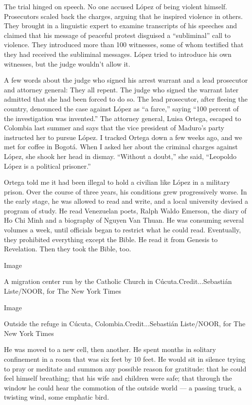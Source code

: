 The trial hinged on speech. No one accused López of being violent
himself. Prosecutors scaled back the charges, arguing that he inspired
violence in others. They brought in a linguistic expert to examine
transcripts of his speeches and claimed that his message of peaceful
protest disguised a ``subliminal'' call to violence. They introduced
more than 100 witnesses, some of whom testified that they had received
the subliminal messages. López tried to introduce his own witnesses, but
the judge wouldn't allow it.

A few words about the judge who signed his arrest warrant and a lead
prosecutor and attorney general: They all repent. The judge who signed
the warrant later admitted that she had been forced to do so. The lead
prosecutor, after fleeing the country, denounced the case against López
as ``a farce,'' saying ``100 percent of the investigation was
invented.'' The attorney general, Luisa Ortega, escaped to Colombia last
summer and says that the vice president of Maduro's party instructed her
to pursue López. I tracked Ortega down a few weeks ago, and we met for
coffee in Bogotá. When I asked her about the criminal charges against
López, she shook her head in dismay. ``Without a doubt,'' she said,
``Leopoldo López is a political prisoner.''

Ortega told me it had been illegal to hold a civilian like López in a
military prison. Over the course of three years, his conditions grew
progressively worse. In the early stage, he was allowed to read and
write, and a local university devised a program of study. He read
Venezuelan poets, Ralph Waldo Emerson, the diary of Ho Chi Minh and a
biography of Nguyen Van Thuan. He was consuming several volumes a week,
until officials began to restrict what he could read. Eventually, they
prohibited everything except the Bible. He read it from Genesis to
Revelation. Then they took the Bible, too.

Image

A migration center run by the Catholic Church in
Cúcuta.Credit...Sebastián Liste/NOOR, for The New York Times

Image

Outside the refuge in Cúcuta, Colombia.Credit...Sebastián Liste/NOOR,
for The New York Times

He was moved to a new cell, then another. He spent months in solitary
confinement in a room that was six feet by 10 feet. He would sit in
silence trying to pray or meditate and summon any possible reason for
gratitude: that he could feel himself breathing; that his wife and
children were safe; that through the window he could hear the commotion
of the outside world --- a passing truck, a twisting wind, some emphatic
bird.

